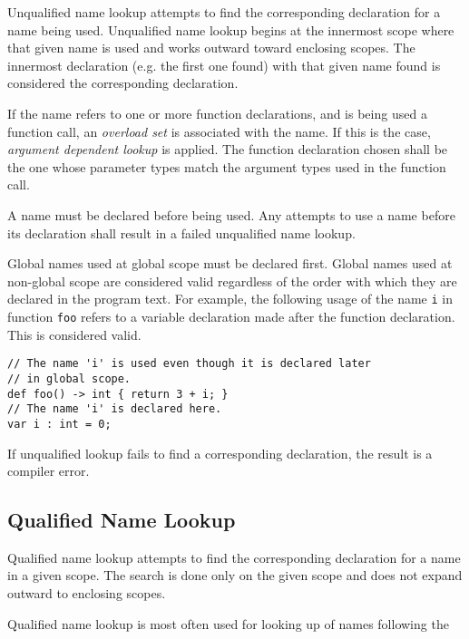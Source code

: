 Unqualified name lookup attempts to find the corresponding declaration for a name being used. Unqualified name lookup begins at the innermost scope where that given name is used and works outward toward enclosing scopes. The innermost declaration (e.g. the first one found) with that given name found is considered the corresponding declaration. 

If the name refers to one or more function declarations, and is being used a function call, an \textit{overload set} is associated with the name. If this is the case, \textit{argument dependent lookup} is applied. The function declaration chosen shall be the one whose parameter types match the argument types used in the function call.

A name must be declared before being used. Any attempts to use a name before its declaration shall result in a failed unqualified name lookup.

Global names used at global scope must be declared first. Global names used at non-global scope are considered valid regardless of the order with which they are declared in the program text. For example, the following usage of the name \texttt{i} in function \texttt{foo} refers to a variable declaration made after the function declaration. This is considered valid.

\noindent\begin{minipage}{\linewidth}

\begin{lstlisting}
// The name 'i' is used even though it is declared later
// in global scope.
def foo() -> int { return 3 + i; }
// The name 'i' is declared here.
var i : int = 0;
\end{lstlisting}

\end{minipage}

If unqualified lookup fails to find a corresponding declaration, the result is a compiler error.

\subsection{Qualified Name Lookup}

Qualified name lookup attempts to find the corresponding declaration for a name in a given scope. The search is done only on the given scope and does not expand outward to enclosing scopes.

Qualified name lookup is most often used for looking up of names following the 

